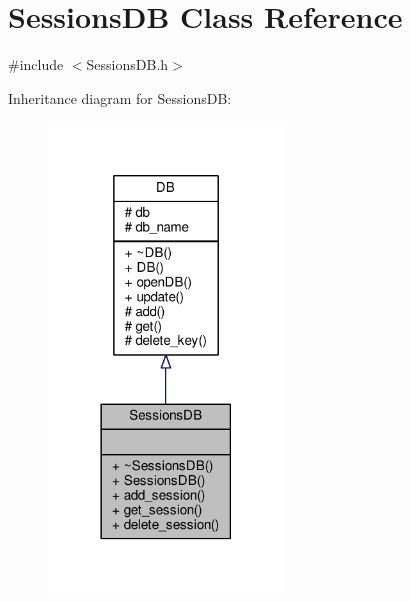 \hypertarget{classSessionsDB}{}\section{Sessions\+DB Class Reference}
\label{classSessionsDB}


{\ttfamily \#include $<$Sessions\+D\+B.\+h$>$}



Inheritance diagram for Sessions\+DB\+:\nopagebreak
\begin{figure}[H]
\begin{center}
\leavevmode
\includegraphics[width=177pt]{d3/d76/classSessionsDB__inherit__graph}
\end{center}
\end{figure}


